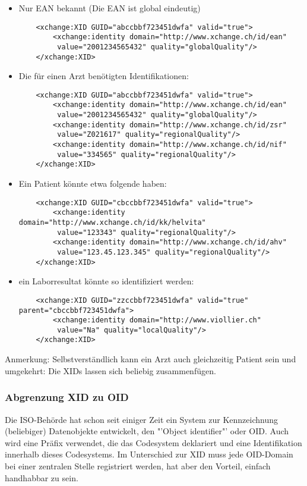 \documentclass[a4paper]{scrartcl}
\begin{document}
\begin{itemize}
\item Nur EAN bekannt (Die EAN ist global eindeutig)
\begin{verbatim}
    <xchange:XID GUID="abccbbf723451dwfa" valid="true">
        <xchange:identity domain="http://www.xchange.ch/id/ean"
         value="2001234565432" quality="globalQuality"/>
    </xchange:XID>
\end{verbatim}

\item Die für einen Arzt benötigten Identifikationen:
\begin{verbatim}
    <xchange:XID GUID="abccbbf723451dwfa" valid="true">
        <xchange:identity domain="http://www.xchange.ch/id/ean"
         value="2001234565432" quality="globalQuality"/>
        <xchange:identity domain="http://www.xchange.ch/id/zsr"
         value="Z021617" quality="regionalQuality"/>
        <xchange:identity domain="http://www.xchange.ch/id/nif"
         value="334565" quality="regionalQuality"/>
    </xchange:XID>
\end{verbatim}

\item Ein Patient könnte etwa folgende haben:
\begin{verbatim}
    <xchange:XID GUID="cbccbbf723451dwfa" valid="true">
        <xchange:identity domain="http://www.xchange.ch/id/kk/helvita"
         value="123343" quality="regionalQuality"/>
        <xchange:identity domain="http://www.xchange.ch/id/ahv"
         value="123.45.123.345" quality="regionalQuality"/>
    </xchange:XID>
\end{verbatim}

\item ein Laborresultat könnte so identifiziert werden:
\begin{verbatim}
    <xchange:XID GUID="zzccbbf723451dwfa" valid="true" parent="cbccbbf723451dwfa">
        <xchange:identity domain="http://www.viollier.ch"
         value="Na" quality="localQuality"/>
    </xchange:XID>
\end{verbatim}

\end{itemize}

Anmerkung: Selbstverständlich kann ein Arzt auch gleichzeitig Patient sein und umgekehrt: Die XIDs lassen sich beliebig zusammenfügen.

\subsubsection{Abgrenzung XID zu OID}
Die ISO-Behörde hat schon seit einiger Zeit ein System zur Kennzeichnung (beliebiger) Datenobjekte entwickelt, den "'Object identifier"' oder OID. Auch wird eine Präfix verwendet, die das Codesystem deklariert und eine Identifikation innerhalb dieses Codesystems. Im Unterschied zur XID muss jede OID-Domain bei einer zentralen Stelle registriert werden, hat aber den Vorteil, einfach handhabbar zu sein.
\end{document}
